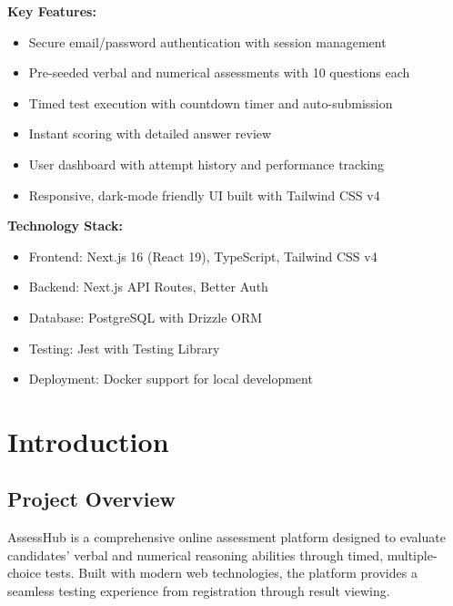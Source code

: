 \documentclass[12pt,a4paper]{report}
\begin{document}
\textbf{Key Features:}
\begin{itemize}
    \item Secure email/password authentication with session management
    \item Pre-seeded verbal and numerical assessments with 10 questions each
    \item Timed test execution with countdown timer and auto-submission
    \item Instant scoring with detailed answer review
    \item User dashboard with attempt history and performance tracking
    \item Responsive, dark-mode friendly UI built with Tailwind CSS v4
\end{itemize}

\textbf{Technology Stack:}
\begin{itemize}
    \item Frontend: Next.js 16 (React 19), TypeScript, Tailwind CSS v4
    \item Backend: Next.js API Routes, Better Auth
    \item Database: PostgreSQL with Drizzle ORM
    \item Testing: Jest with Testing Library
    \item Deployment: Docker support for local development
\end{itemize}

\newpage

\tableofcontents

\newpage

\listoftables

\newpage

\listoffigures

\newpage

\chapter{Introduction}

\section{Project Overview}

AssessHub is a comprehensive online assessment platform designed to evaluate candidates' verbal and numerical reasoning abilities through timed, multiple-choice tests. Built with modern web technologies, the platform provides a seamless testing experience from registration through result viewing.
\end{document}
